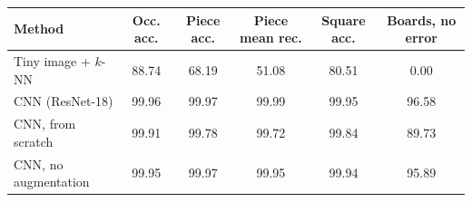 \begin{tabular}{lccccc}
\toprule
Method & Occ. acc. & Piece acc. & Piece mean rec. & Square acc. & Boards, no error \\
\midrule
Tiny image + $k$-NN & 88.74 & 68.19 & 51.08 & 80.51 & 0.00 \\
CNN (ResNet-18) & 99.96 & 99.97 & 99.99 & 99.95 & 96.58 \\
CNN, from scratch & 99.91 & 99.78 & 99.72 & 99.84 & 89.73 \\
CNN, no augmentation & 99.95 & 99.97 & 99.95 & 99.94 & 95.89 \\
\bottomrule
\end{tabular}
